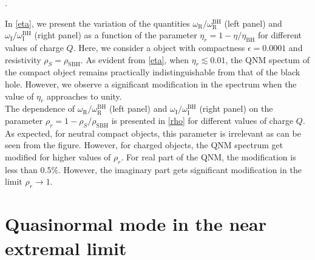 \documentclass[aps,prd,twocolumn,floatfix,noshowpacs,tightenlines,noshowkeys,superscriptaddress,amsmath,amssymb,
nofootinbib]{revtex4-1}
\renewcommand\[{\begin{equation}}
\renewcommand\]{\end{equation}}
\def\RN{Reissner-Nordstr\"{o}m}
\begin{document}
 \cite{Mark:2017dnq}.\par
In \autoref{eta}, we present the variation of the quantities $\omega_{\textrm{R}}/\omega_{\textrm{R}}^{\textrm{BH}}$ (left panel) and $\omega_{\textrm{I}}/\omega_{\textrm{I}}^{\textrm{BH}}$ (right panel) as a function of the parameter $\eta_r=1-\eta/\eta_{\textrm{BH}}$ for different values of charge $Q$. Here, we consider a object with compactness $\epsilon=0.0001$ and resistivity $\rho_{S}=\rho_{\textrm{SBH}}$. As evident from \autoref{eta}, when $\eta_r\lesssim 0.01$, the QNM spectum of the compact object remains practically indistinguishable from that of the black hole. However, we observe a significant modification in the spectrum when the value of $\eta_r$ approaches to unity.  
\\
The dependence of  $\omega_{\textrm{R}}/\omega_{\textrm{R}}^{\textrm{BH}}$ (left panel) and $\omega_{\textrm{I}}/\omega_{\textrm{I}}^{\textrm{BH}}$ (right panel) on the parameter $\rho_r=1-\rho_{S}/\rho_{\textrm{SBH}}$ is presented in \autoref{rho} for different values of charge $Q$.  As expected, for neutral compact objects, this parameter is irrelevant as can be seen from the figure. However, for charged objects, the QNM spectrum get modified for higher values of $\rho_r$. For real part of the QNM, the modification is less than $0.5\%$. However, the imaginary part gets significant modification in the limit $\rho_r\to 1$. 


\section{Quasinormal mode in the near extremal limit}\label{Near extremal modes}
\end{document}
